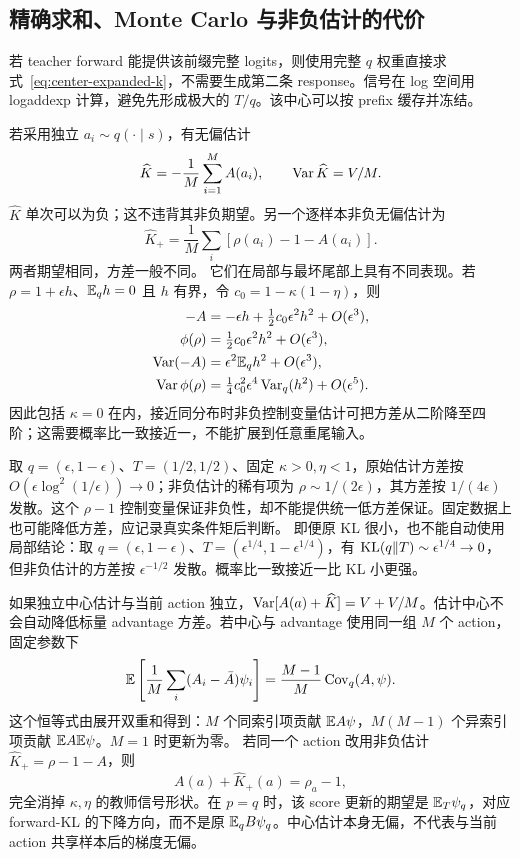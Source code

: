 \subsection{精确求和、Monte Carlo 与非负估计的代价}

若 teacher forward 能提供该前缀完整 logits，则使用完整 $q$ 权重直接求式~\eqref{eq:center-expanded-k}，不需要生成第二条 response。信号在 log 空间用 logaddexp 计算，避免先形成极大的 $T/q$。该中心可以按 prefix 缓存并冻结。

若采用独立 $a_i\sim q(\cdot\mid s)$，有无偏估计
\begin{equation}
 \widehat K=-\frac1M\sum_{i=1}^MA(a_i),\qquad
 \operatorname{Var}\widehat K=V/M.
\end{equation}
$\widehat K$ 单次可以为负；这不违背其非负期望。另一个逐样本非负无偏估计为
\begin{equation}
 \widehat K_+=\frac1M\sum_i[\rho(a_i)-1-A(a_i)].
\end{equation}
两者期望相同，方差一般不同。 它们在局部与最坏尾部上具有不同表现。若 $\rho=1+\epsilon h$、$\mathbb E_qh=0$ 且 $h$ 有界，令 $c_0=1-\kappa(1-\eta)$，则
\begin{align}
 -A&=-\epsilon h+\tfrac12c_0\epsilon^2h^2+O(\epsilon^3),\\
 \phi(\rho)&=\tfrac12c_0\epsilon^2h^2+O(\epsilon^3),\\
 \operatorname{Var}(-A)&=\epsilon^2\mathbb E_qh^2+O(\epsilon^3),\\
 \operatorname{Var}\phi(\rho)&=\tfrac14c_0^2\epsilon^4\operatorname{Var}_q(h^2)+O(\epsilon^5).
\end{align}
因此包括 $\kappa=0$ 在内，接近同分布时非负控制变量估计可把方差从二阶降至四阶；这需要概率比一致接近一，不能扩展到任意重尾输入。

取 $q=(\epsilon,1-\epsilon)$、$T=(1/2,1/2)$、固定 $\kappa>0,\eta<1$，原始估计方差按 $O(\epsilon\log^2(1/\epsilon))\to0$；非负估计的稀有项为 $\rho\sim1/(2\epsilon)$，其方差按 $1/(4\epsilon)$ 发散。这个 $\rho-1$ 控制变量保证非负性，却不能提供统一低方差保证。固定数据上也可能降低方差，应记录真实条件矩后判断。 即便原 KL 很小，也不能自动使用局部结论：取 $q=(\epsilon,1-\epsilon)$、$T=(\epsilon^{1/4},1-\epsilon^{1/4})$，有 $\operatorname{KL}(q\Vert T)\sim\epsilon^{1/4}\to0$，但非负估计的方差按 $\epsilon^{-1/2}$ 发散。概率比一致接近一比 KL 小更强。

如果独立中心估计与当前 action 独立，$\operatorname{Var}[A(a)+\widehat K]=V+V/M$。估计中心不会自动降低标量 advantage 方差。若中心与 advantage 使用同一组 $M$ 个 action，固定参数下
\begin{equation}
 \mathbb E\left[\frac1M\sum_i(A_i-\bar A)\psi_i\right]
 =\frac{M-1}{M}\operatorname{Cov}_q(A,\psi).
\end{equation}
这个恒等式由展开双重和得到：$M$ 个同索引项贡献 $\mathbb E A\psi$，$M(M-1)$ 个异索引项贡献 $\mathbb E A\mathbb E\psi$。$M=1$ 时更新为零。 若同一个 action 改用非负估计 $\widehat K_+=\rho-1-A$，则
\begin{equation}
 A(a)+\widehat K_+(a)=\rho_a-1,
\end{equation}
完全消掉 $\kappa,\eta$ 的教师信号形状。在 $p=q$ 时，该 score 更新的期望是 $\mathbb E_T\psi_q$，对应 forward-KL 的下降方向，而不是原 $\mathbb E_qB\psi_q$。中心估计本身无偏，不代表与当前 action 共享样本后的梯度无偏。

